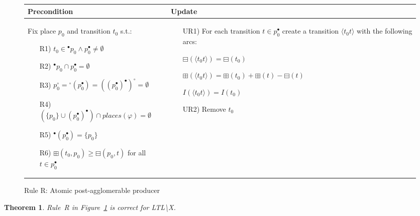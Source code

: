 \documentclass[11pt]{article}
\newtheorem{theorem}{Theorem}
\begin{document}
\begin{figure}[h!]
\begin{adjustbox}{center}
\begin{tikzpicture}[scale=0.98]
            \end{tikzpicture}
        \end{adjustbox}
        \vspace{5mm}

        \begin{adjustbox}{center}
            \begin{tabular}{|p{68mm}|p{75mm}|} \hline
            Precondition & Update \\ \hline
            Fix place $p_0$ and transition $t_0$ s.t.:
            \begin{itemize}[leftmargin=10mm]
                \item[R1)] $t_0\in {}^\bullet p_0\land p_0^\bullet\neq\emptyset$
                \item[R2)] $^\bullet p_0 \cap p_0^\bullet = \emptyset$
                \item[R3)] $p_0 ^\circ = {}^\circ (p_0^\bullet) = ((p_0^\bullet)^\bullet)^\circ = \emptyset$
                \item[R4)] $(\{p_0\} \cup (p_0^\bullet)^\bullet) \cap places(\varphi) = \emptyset$
                \item[R5)] ${}^\bullet (p_0^\bullet)=\{p_0\}$
                \item[R6)] $\boxplus(t_0, p_0)\geq \boxminus(p_0,t)$ for all $t\in p_0^\bullet$
            \end{itemize} &

            \begin{itemize}[leftmargin=10mm]
                \item[UR1)]
                For each transition $t \in p_0^\bullet$ create a transition $\langle t_0 t\rangle$ with the following arcs:

                $\boxminus(\langle t_0 t\rangle)=\boxminus(t_0)$

                $\boxplus(\langle t_0 t\rangle)=\boxplus(t_0)+\boxplus(t)-\boxminus(t)$

                $I(\langle t_0 t\rangle)=I(t_0)$

                \item[UR2)] Remove $t_0$
            \end{itemize} \\ \hline
            \end{tabular}
        \end{adjustbox}
        \caption{Rule R: Atomic post-agglomerable producer}
        \label{fig:rule_r}
    \end{figure}

    \begin{theorem}
        Rule~R in Figure~\ref{fig:rule_r} is correct for LTL\textbackslash X.
    \end{theorem}
\end{document}
